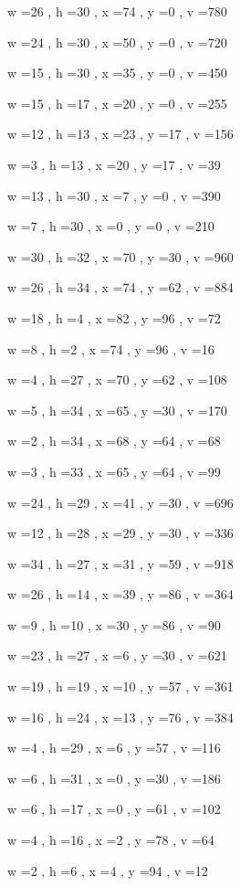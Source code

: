 \documentclass[11pt]{article}
\begin{document}
w =26 , h =30 , x =74 , y =0 , v =780
\par
w =24 , h =30 , x =50 , y =0 , v =720
\par
w =15 , h =30 , x =35 , y =0 , v =450
\par
w =15 , h =17 , x =20 , y =0 , v =255
\par
w =12 , h =13 , x =23 , y =17 , v =156
\par
w =3 , h =13 , x =20 , y =17 , v =39
\par
w =13 , h =30 , x =7 , y =0 , v =390
\par
w =7 , h =30 , x =0 , y =0 , v =210
\par
w =30 , h =32 , x =70 , y =30 , v =960
\par
w =26 , h =34 , x =74 , y =62 , v =884
\par
w =18 , h =4 , x =82 , y =96 , v =72
\par
w =8 , h =2 , x =74 , y =96 , v =16
\par
w =4 , h =27 , x =70 , y =62 , v =108
\par
w =5 , h =34 , x =65 , y =30 , v =170
\par
w =2 , h =34 , x =68 , y =64 , v =68
\par
w =3 , h =33 , x =65 , y =64 , v =99
\par
w =24 , h =29 , x =41 , y =30 , v =696
\par
w =12 , h =28 , x =29 , y =30 , v =336
\par
w =34 , h =27 , x =31 , y =59 , v =918
\par
w =26 , h =14 , x =39 , y =86 , v =364
\par
w =9 , h =10 , x =30 , y =86 , v =90
\par
w =23 , h =27 , x =6 , y =30 , v =621
\par
w =19 , h =19 , x =10 , y =57 , v =361
\par
w =16 , h =24 , x =13 , y =76 , v =384
\par
w =4 , h =29 , x =6 , y =57 , v =116
\par
w =6 , h =31 , x =0 , y =30 , v =186
\par
w =6 , h =17 , x =0 , y =61 , v =102
\par
w =4 , h =16 , x =2 , y =78 , v =64
\par
w =2 , h =6 , x =4 , y =94 , v =12
\par
\newpage
\end{document}
